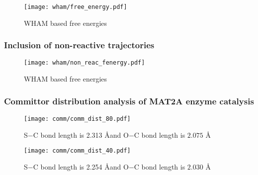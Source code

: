 \documentclass[a4paper,8pt]{beamer}
\begin{document}
%
\begin{frame}
\begin{figure}
\texttt{[image: wham/free\_energy.pdf]}
\caption{WHAM based free energies}
\end{figure}
\end{frame}
%
\begin{frame}
\frametitle{Inclusion of non-reactive trajectories}
\begin{figure}
\texttt{[image: wham/non\_reac\_fenergy.pdf]}
\caption{WHAM based free energies}
\end{figure}
\end{frame}
%
\begin{frame}
\frametitle{Committor distribution analysis of MAT2A enzyme catalysis}
    \begin{figure}[ht]
        \begin{minipage}[b]{0.45\linewidth}
            \centering
            \texttt{[image: comm/comm\_dist\_80.pdf]}
            \caption{S$-$C bond length is 2.313 \AA and O$-$C bond length is $2.075$ \AA}
            \label{fig:a}
        \end{minipage}
        \hspace{0.5cm}
        \begin{minipage}[b]{0.45\linewidth}
            \centering
            \texttt{[image: comm/comm\_dist\_40.pdf]}
            \caption{S$-$C bond length is 2.254 \AA and O$-$C bond length is $2.030$ \AA}
            \label{fig:b}
        \end{minipage}
    \end{figure}
\end{frame}
%
\end{document}
